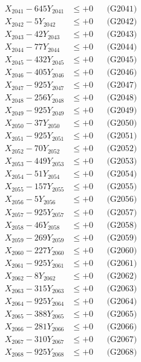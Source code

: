 \documentclass[a4paper,10pt]{article}
\begin{document}
{\begin{align}
\allowbreak
X_{2041} - 645Y_{2041} &\leq +0 && \text{(G2041)} \\
X_{2042} - 5Y_{2042} &\leq +0 && \text{(G2042)} \\
X_{2043} - 42Y_{2043} &\leq +0 && \text{(G2043)} \\
X_{2044} - 77Y_{2044} &\leq +0 && \text{(G2044)} \\
X_{2045} - 432Y_{2045} &\leq +0 && \text{(G2045)} \\
X_{2046} - 405Y_{2046} &\leq +0 && \text{(G2046)} \\
X_{2047} - 925Y_{2047} &\leq +0 && \text{(G2047)} \\
X_{2048} - 256Y_{2048} &\leq +0 && \text{(G2048)} \\
X_{2049} - 925Y_{2049} &\leq +0 && \text{(G2049)} \\
X_{2050} - 37Y_{2050} &\leq +0 && \text{(G2050)} \\
\allowbreak
X_{2051} - 925Y_{2051} &\leq +0 && \text{(G2051)} \\
X_{2052} - 70Y_{2052} &\leq +0 && \text{(G2052)} \\
X_{2053} - 449Y_{2053} &\leq +0 && \text{(G2053)} \\
X_{2054} - 51Y_{2054} &\leq +0 && \text{(G2054)} \\
X_{2055} - 157Y_{2055} &\leq +0 && \text{(G2055)} \\
X_{2056} - 5Y_{2056} &\leq +0 && \text{(G2056)} \\
X_{2057} - 925Y_{2057} &\leq +0 && \text{(G2057)} \\
X_{2058} - 46Y_{2058} &\leq +0 && \text{(G2058)} \\
X_{2059} - 269Y_{2059} &\leq +0 && \text{(G2059)} \\
X_{2060} - 227Y_{2060} &\leq +0 && \text{(G2060)} \\
\allowbreak
X_{2061} - 925Y_{2061} &\leq +0 && \text{(G2061)} \\
X_{2062} - 8Y_{2062} &\leq +0 && \text{(G2062)} \\
X_{2063} - 315Y_{2063} &\leq +0 && \text{(G2063)} \\
X_{2064} - 925Y_{2064} &\leq +0 && \text{(G2064)} \\
X_{2065} - 388Y_{2065} &\leq +0 && \text{(G2065)} \\
X_{2066} - 281Y_{2066} &\leq +0 && \text{(G2066)} \\
X_{2067} - 310Y_{2067} &\leq +0 && \text{(G2067)} \\
X_{2068} - 925Y_{2068} &\leq +0 && \text{(G2068)} \\

\end{align}}
\end{document}
